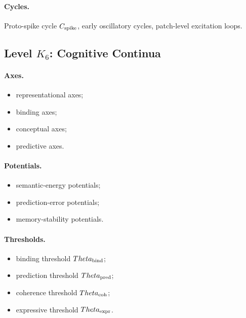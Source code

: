 \paragraph{Cycles.}
Proto-spike cycle \(C_{\rm spike}\),
early oscillatory cycles,
patch-level excitation loops.


\subsection{Level \texorpdfstring{\texorpdfstring{$K_6$}{K\_6}}{K6}: Cognitive Continua}

\paragraph{Axes.}
\begin{itemize}
    \item representational axes;
    \item binding axes;
    \item conceptual axes;
    \item predictive axes.
\end{itemize}

\paragraph{Potentials.}
\begin{itemize}
    \item semantic-energy potentials;
    \item prediction-error potentials;
    \item memory-stability potentials.
\end{itemize}

\paragraph{Thresholds.}
\begin{itemize}
    \item binding threshold \(\Theta_{\rm bind}\);
    \item prediction threshold \(\Theta_{\rm pred}\);
    \item coherence threshold \(\Theta_{\rm coh}\);
    \item expressive threshold \(\Theta_{\rm expr}\).
\end{itemize}

